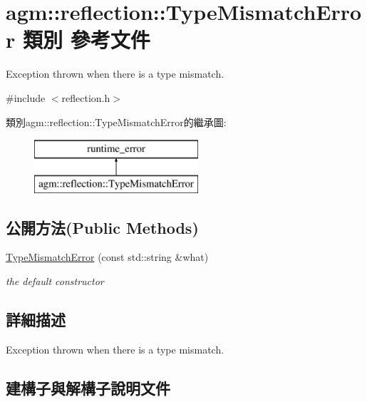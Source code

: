\hypertarget{classagm_1_1reflection_1_1_type_mismatch_error}{}\section{agm\+:\+:reflection\+:\+:Type\+Mismatch\+Error 類別 參考文件}
\label{classagm_1_1reflection_1_1_type_mismatch_error}


Exception thrown when there is a type mismatch.  




{\ttfamily \#include $<$reflection.\+h$>$}

類別agm\+:\+:reflection\+:\+:Type\+Mismatch\+Error的繼承圖\+:\begin{figure}[H]
\begin{center}
\leavevmode
\includegraphics[height=2.000000cm]{classagm_1_1reflection_1_1_type_mismatch_error}
\end{center}
\end{figure}
\subsection*{公開方法(Public Methods)}
\begin{DoxyCompactItemize}
\item 
\hyperlink{classagm_1_1reflection_1_1_type_mismatch_error_a54bb6d2db38fb8a87b029bc2f83df1f1}{Type\+Mismatch\+Error} (const std\+::string \&what)
\begin{DoxyCompactList}\small\item\em the default constructor \end{DoxyCompactList}\end{DoxyCompactItemize}


\subsection{詳細描述}
Exception thrown when there is a type mismatch. 

\subsection{建構子與解構子說明文件}
